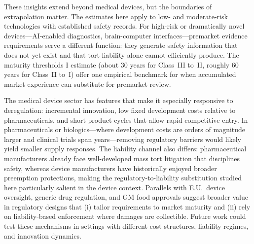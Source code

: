 \documentclass[letterpaper,12pt]{article}
\theoremstyle{definition}
\begin{document}
These insights extend beyond medical devices, but the boundaries of extrapolation matter. The estimates here apply to low- and moderate-risk technologies with established safety records. For high-risk or dramatically novel devices---AI-enabled diagnostics, brain-computer interfaces---premarket evidence requirements serve a different function: they generate safety information that does not yet exist and that tort liability alone cannot efficiently produce. The maturity thresholds I estimate (about 30 years for Class~III to~II, roughly 60 years for Class~II to~I) offer one empirical benchmark for when accumulated market experience can substitute for premarket review.

The medical device sector has features that make it especially responsive to deregulation: incremental innovation, low fixed development costs relative to pharmaceuticals, and short product cycles that allow rapid competitive entry. In pharmaceuticals or biologics---where development costs are orders of magnitude larger and clinical trials span years---removing regulatory barriers would likely yield smaller supply responses.\footnotemark {} The liability channel also differs: pharmaceutical manufacturers already face well-developed mass tort litigation that disciplines safety, whereas device manufacturers have historically enjoyed broader preemption protections, making the regulatory-to-liability substitution studied here particularly salient in the device context. Parallels with E.U.\ device oversight, generic drug regulation, and GM food approvals suggest broader value in regulatory designs that (i) tailor requirements to market maturity and (ii) rely on liability-based enforcement where damages are collectible. Future work could test these mechanisms in settings with different cost structures, liability regimes, and innovation dynamics.
\end{document}
